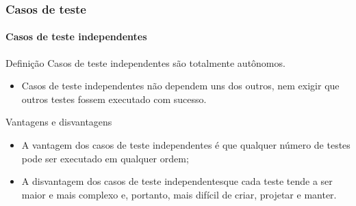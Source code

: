 \begin{frame}[hasprev=true, hasnext=false]
\label{concept:independent-test-case}
\frametitle{Casos de teste}
\framesubtitle{Casos de teste independentes}

\begin{block:concept}{Definição}
Casos de teste independentes são totalmente autônomos.
\begin{itemize}
	\item Casos de teste independentes não dependem uns dos outros, nem exigir que outros testes fossem executado com sucesso.
\end{itemize}
\end{block:concept}

\begin{block:fact}{Vantagens e disvantagens}
\begin{itemize}
	\item A vantagem dos casos de teste independentes é que qualquer número de testes pode ser executado em qualquer ordem;

	\item A disvantagem dos casos de teste independentesque cada teste tende a ser maior e mais complexo e, portanto, mais difícil de criar, projetar e manter.
\end{itemize}
\end{block:fact}
\end{frame}